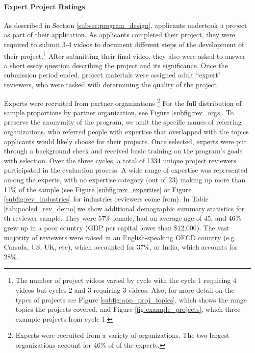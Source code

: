 \paragraph{Expert Project Ratings}

As described in Section \ref{subsec:program_design}, applicants undertook a project as part of their application. As applicants completed their project, they were required to submit 3-4 videos to document different steps of the development of their project.\footnote{The number of project videos varied by cycle with the cycle 1 requiring 4 videos but cycles 2 and 3 requiring 3 videos. Also, for more detail on the types of projects see Figure \ref{subfig:app_proj_topics}, which shows the range topics the projects covered, and Figure \ref{fig:example_projects}, which three example projects from cycle 1.} After submitting their final video, they also were asked to answer a short essay question describing the project and its significance. Once the submission period ended, project materials were assigned adult ``expert" reviewers, who were tasked with determining the quality of the project. 

Experts were recruited from partner organizations \footnote{Experts were recruited from a variety of organizations. The two largest organizations account for 46\% of of the experts.} For the full distribution of sample proportions by partner organization, see Figure \ref{subfig:rev_orgs}. To preserve the anonymity of the program, we omit the specific names of referring organizations. who referred people with expertise that overlapped with the topics applicants would likely choose for their projects. Once selected, experts were put through a background check and received basic training on the program's goals with selection. Over the three cycles, a total of 1334 unique project reviewers participated in the evaluation process. A wide range of expertise was represented among the experts, with no expertise category (out of 23) making up more than 11\% of the sample (see Figure \ref{subfig:rev_expertise} or Figure \ref{subfig:rev_industries} for industries reviewers come from). In Table \ref{tab:pooled_rev_demo} we show additional demographic summary statistics for th reviewer sample. They were 57\% female, had an average age of 45, and 46\% grew up in a poor country (GDP per capital lower than \$12,000). The vast majority of reviewers were raised in an English-speaking OECD country (e.g. Canada, US, UK, etc), which accounted for 37\%, or India, which accounts for 28\%.

